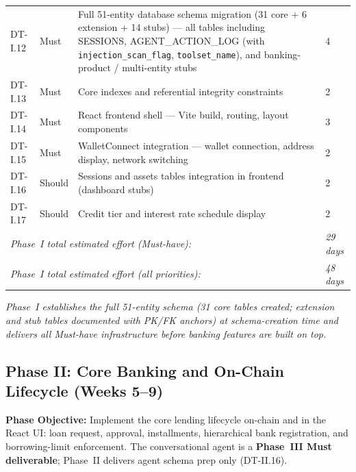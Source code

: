 \documentclass[12pt,a4paper]{report}
\begin{document}
\begin{table}[H]
\begin{tabular}{p{1.8cm}p{1.8cm}p{7.5cm}p{1.5cm}}
DT-I.12 & Must & Full 51-entity database schema migration (31 core + 6 extension + 14 stubs) --- all tables including SESSIONS, AGENT\_ACTION\_LOG (with \texttt{injection\_scan\_flag}, \texttt{toolset\_name}), and banking-product / multi-entity stubs & 4 \\
DT-I.13 & Must & Core indexes and referential integrity constraints & 2 \\
DT-I.14 & Must & React frontend shell --- Vite build, routing, layout components & 3 \\
DT-I.15 & Must & WalletConnect integration --- wallet connection, address display, network switching & 2 \\
DT-I.16 & Should & Sessions and assets tables integration in frontend (dashboard stubs) & 2 \\
DT-I.17 & Should & Credit tier and interest rate schedule display & 2 \\
\multicolumn{3}{l}{\textit{Phase~I total estimated effort (Must-have):}} & \textit{29 days} \\
\multicolumn{3}{l}{\textit{Phase~I total estimated effort (all priorities):}} & \textit{48 days} \\
\bottomrule
\end{tabular}
\end{table}


\vspace{2pt}
\noindent\textit{\small Phase~I establishes the full 51-entity schema (31 core tables created; extension and stub tables documented with PK/FK anchors) at schema-creation time and delivers all Must-have infrastructure before banking features are built on top.}

\subsection{Phase II: Core Banking and On-Chain Lifecycle (Weeks 5--9)}

\textbf{Phase Objective:} Implement the core lending lifecycle on-chain and in the React UI: loan request, approval, installments, hierarchical bank registration, and borrowing-limit enforcement. The conversational agent is a \textbf{Phase~III Must deliverable}; Phase~II delivers agent schema prep only (DT-II.16).
\end{document}

